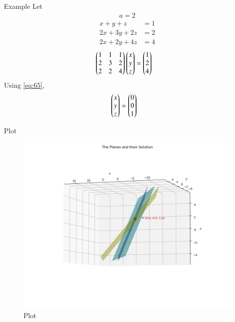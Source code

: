 \documentclass{beamer}
\begin{document}
\begin{frame}{Example}
Let
\begin{align*}
    a = 2
\end{align*}
\begin{align*}
    x+y+z&=1 \\
    2x+3y+2z&=2 \\
    2x+2y+4z&=4
\end{align*}
\begin{align*}
    \begin{pmatrix}1 & 1 & 1 \\ 2 & 3 & 2 \\ 2 & 2 & 4\end{pmatrix}\begin{pmatrix}x\\y\\z\end{pmatrix} &= \begin{pmatrix}1\\2\\4\end{pmatrix}
\end{align*}
Using \eqref{eq:65},
\begin{align}
    \begin{pmatrix}x\\y\\z\end{pmatrix} &= \begin{pmatrix}0 \\ 0 \\ 1\end{pmatrix}
\end{align}
\end{frame}

\begin{frame}{Plot}
    \begin{figure}
        \centering
        \includegraphics[width=0.5\columnwidth]{../figs/plot_c.jpg}
        \caption{Plot}
        \label{fig:fig}
    \end{figure}
\end{frame}
\end{document}
